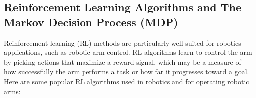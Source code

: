 \documentclass[12pt,oneside]{article}
\begin{document}

\subsection{Reinforcement Learning Algorithms and The Markov Decision Process (MDP)}
Reinforcement learning (RL) methods are particularly well-suited for robotics applications, such as robotic arm control. RL algorithms learn to control the arm by picking actions that maximize a reward signal, which may be a measure of how successfully the arm performs a task or how far it progresses toward a goal. Here are some popular RL algorithms used in robotics and for operating robotic arms:
\end{document}
